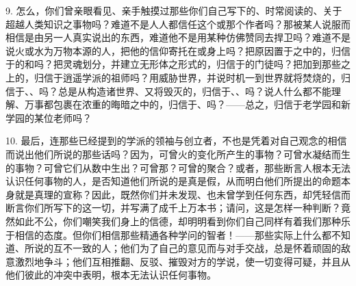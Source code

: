 9. 怎么，你们曾亲眼看见、亲手触摸过那些你们自己写下的、时常阅读的、关于超越人类知识之事物吗？难道不是人人都信任这个或那个作者吗？那被某人说服而相信是由另一人真实说出的东西，难道他不是用某种仿佛赞同去捍卫吗？难道不是说火或水为万物本源的人，把他的信仰寄托在或身上吗？把原因置于之中的，归信于的和吗？把灵魂划分，并建立无形体之形式的，归信于的门徒吗？把加到那些之上的，归信于逍遥学派的祖师吗？用威胁世界，并说时机一到世界就将焚烧的，归信于、、吗？总是从构造诸世界、又将毁灭的，归信于、、吗？说人什么都不能理解、万事都包裹在浓重的晦暗之中的，归信于、吗？——总之，归信于老学园和新学园的某位老师吗？\par

10. 最后，连那些已经提到的学派的领袖与创立者，不也是凭着对自己观念的相信而说出他们所说的那些话吗？因为，可曾火的变化所产生的事物？可曾水凝结而生的事物？可曾它们从数中生出？可曾那？可曾的聚合？或者，那些断言人根本无法认识任何事物的人，是否知道他们所说的是真是假，从而明白他们所提出的命题本身就是真理的宣称？因此，既然你们并未发现、也未曾学到任何东西，却凭轻信而断言你们所写下的这一切，并写满了成千上万本书；请问，这是怎样一种判断？竟然如此不公，你们嘲笑我们身上的信德，却明明看到你们自己同样有着我们那种乐于相信的态度。但你们相信那些精通各种学问的智者！——那些实际上什么都不知道、所说的互不一致的人；他们为了自己的意见而与对手交战，总是怀着顽固的敌意激烈地争斗；他们互相推翻、反驳、摧毁对方的学说，使一切变得可疑，并且从他们彼此的冲突中表明，根本无法认识任何事物。\par

